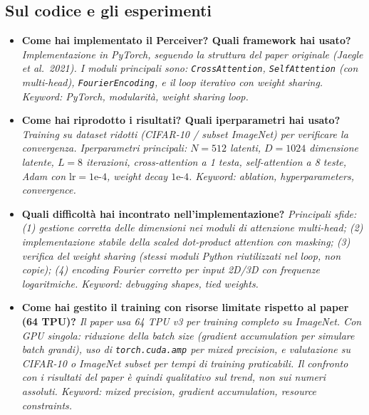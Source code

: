 \documentclass[
  11pt,
]{article}
\begin{document}
\subsection{Sul codice e gli esperimenti}

\begin{itemize}

  \item \textbf{Come hai implementato il Perceiver? Quali framework hai usato?}
  \textit{Implementazione in PyTorch, seguendo la struttura del paper originale (Jaegle et al.\ 2021). I moduli principali sono: \texttt{CrossAttention}, \texttt{SelfAttention} (con multi-head), \texttt{FourierEncoding}, e il loop iterativo con weight sharing. Keyword: PyTorch, modularità, weight sharing loop.}

  \item \textbf{Come hai riprodotto i risultati? Quali iperparametri hai usato?}
  \textit{Training su dataset ridotti (CIFAR-10 / subset ImageNet) per verificare la convergenza. Iperparametri principali: $N=512$ latenti, $D=1024$ dimensione latente, $L=8$ iterazioni, cross-attention a 1 testa, self-attention a 8 teste, Adam con $\text{lr}=1\text{e-}4$, weight decay $1\text{e-}4$. Keyword: ablation, hyperparameters, convergence.}

  \item \textbf{Quali difficoltà hai incontrato nell'implementazione?}
  \textit{Principali sfide: (1) gestione corretta delle dimensioni nei moduli di attenzione multi-head; (2) implementazione stabile della scaled dot-product attention con masking; (3) verifica del weight sharing (stessi moduli Python riutilizzati nel loop, non copie); (4) encoding Fourier corretto per input 2D/3D con frequenze logaritmiche. Keyword: debugging shapes, tied weights.}

  \item \textbf{Come hai gestito il training con risorse limitate rispetto al paper (64 TPU)?}
  \textit{Il paper usa 64 TPU v3 per training completo su ImageNet. Con GPU singola: riduzione della batch size (gradient accumulation per simulare batch grandi), uso di \texttt{torch.cuda.amp} per mixed precision, e valutazione su CIFAR-10 o ImageNet subset per tempi di training praticabili. Il confronto con i risultati del paper è quindi qualitativo sul trend, non sui numeri assoluti. Keyword: mixed precision, gradient accumulation, resource constraints.}

\end{itemize}
\end{document}
